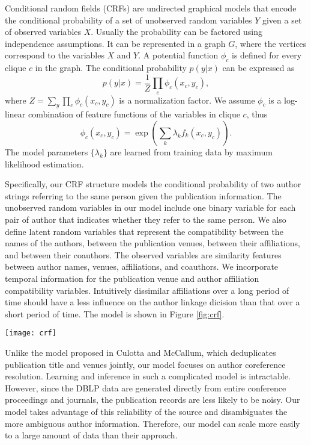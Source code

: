 \documentclass[twocolumn]{article}
\begin{document}
Conditional random fields (CRFs) are undirected graphical models that encode the conditional probability of a set of unobserved random variables $Y$ given a set of observed variables $X$.  Usually the probability can be factored using independence assumptions.  It can be represented in a graph $G$, where the vertices correspond to the variables $X$ and $Y$.  A potential function $\phi_c$ is defined for every clique $c$ in the graph.  The conditional probability $p(y|x)$ can be expressed as
$$p(y|x)=\frac{1}{Z}\prod_c \phi_c(x_c,y_c),$$
where $Z=\sum_y\prod_c \phi_c(x_c,y_c)$ is a normalization factor.  We assume $\phi_c$ is a log-linear combination of feature functions of the variables in clique $c$, thus
$$\phi_c(x_c,y_c)=\exp\left(\sum_k \lambda_k f_k(x_c,y_c)\right).$$
The model parameters $\{\lambda_k\}$ are learned from training data by maximum likelihood estimation.

Specifically, our CRF structure models the conditional probability of
two author strings referring to the same person given the publication
information.  The unobserved random variables in our model include one
binary variable for each pair of author that indicates whether they
refer to the same person.  We also define latent random variables that
represent the compatibility between the names of the authors, between
the publication venues, between their affiliations, and between their
coauthors.  The observed variables are similarity features between
author names, venues, affiliations, and coauthors.  We incorporate
temporal information for the publication venue and author affiliation
compatibility variables.   Intuitively
dissimilar affiliations over a long period of time should have a less
influence on the author linkage dicision than that over a short period
of time. The model is shown in Figure \ref{fig:crf}.

\begin{figure*}
\texttt{[image: crf]}
\caption{Our CRF model for the author linkage problem.  $A_i$ denotes
  the $i$th author string.  The oval nodes are unobserved random
  variables, and the box-shaped ones are observed variables.}
\label{fig:crf}
\end{figure*}

Unlike the model proposed in Culotta and
McCallum\cite{Culotta05aconditional}, which deduplicates publication
title and venues jointly, our model focuses on author coreference
resolution.  Learning and inference in such a complicated model is
intractable.  However, since the DBLP data are generated directly from
entire conference proceedings and journals, the publication records
are less likely to be noisy.  Our model takes advantage of this
reliability of the source and disambiguates the more ambiguous author
information.  Therefore, our model can scale more easily to a large
amount of data than their approach.
\end{document}
